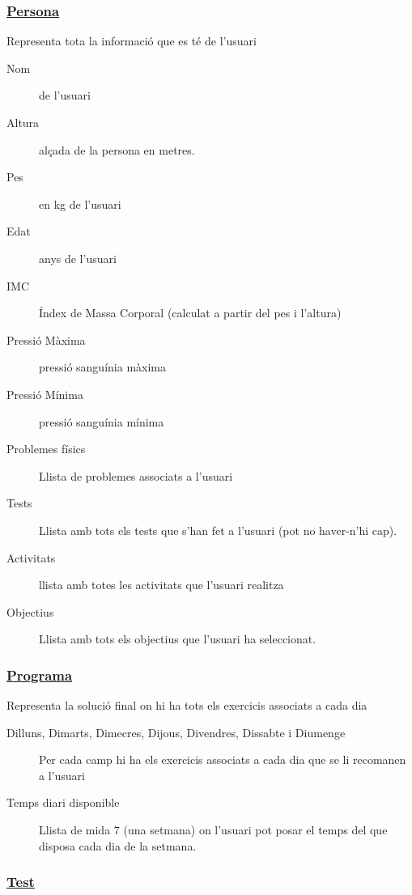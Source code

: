 \documentclass[a4paper, 12pt, UTF8]{article}
\begin{document}
\subsubsection*{\underline{Persona}}

Representa tota la informació que es té de l'usuari

\begin{description}
	\item[Nom] de l'usuari
	\item[Altura] alçada de la persona en metres.
	\item[Pes] en kg de l'usuari
	\item[Edat] anys de l'usuari
	\item[IMC] Índex de Massa Corporal (calculat a partir del pes i l'altura)
	\item[Pressió Màxima] pressió sanguínia màxima
	\item[Pressió Mínima] pressió sanguínia mínima
	\item[Problemes físics] Llista de problemes associats a l'usuari
	\item[Tests] Llista amb tots els tests que s'han fet a l'usuari (pot no haver-n'hi cap).
	\item[Activitats] llista amb totes les activitats que l'usuari realitza
	\item[Objectius] Llista amb tots els objectius que l'usuari ha seleccionat. 
\end{description}

\subsubsection*{\underline{Programa}}

Representa la solució final on hi ha tots els exercicis associats a cada dia

\begin{description}
	\item[Dilluns, Dimarts, Dimecres, Dijous, Divendres, Dissabte i Diumenge] Per cada camp hi ha els exercicis associats a cada dia que se li recomanen a l'usuari
	\item[Temps diari disponible] Llista de mida 7 (una setmana) on l'usuari pot posar el temps del que disposa cada dia de la setmana.
\end{description}

\subsubsection*{\underline{Test}}
\end{document}
